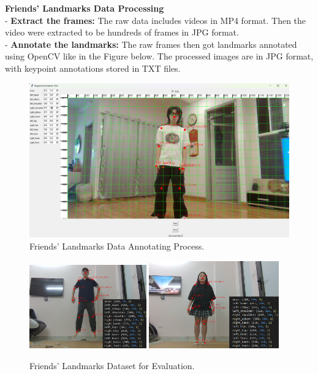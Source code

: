 \documentclass[12pt]{article}
\begin{document}
\textbf{Friends' Landmarks Data Processing}\\[5pt]
\hspace*{1.5em}- \textbf{Extract the frames: }The raw data includes videos in MP4 format. Then the video were extracted to be hundreds of frames in JPG format.\\[5pt]
\hspace*{1.5em}- \textbf{Annotate the landmarks: }The raw frames then got landmarks annotated using OpenCV like in the Figure below. 
The processed images are in JPG format, with keypoint annotations stored in TXT files.\\[5pt]
\begin{figure}[ht]
    \centering
    \includegraphics[width=1\textwidth]{friend1.png}
    \caption{Friends' Landmarks Data Annotating Process.}
\end{figure}

\begin{figure}[ht]
    \centering
    \includegraphics[width=0.45\textwidth]{friend3.png}
    \includegraphics[width=0.5\textwidth]{friend4.png}
    \caption{Friends' Landmarks Dataset for Evaluation.}
\end{figure}
\end{document}
